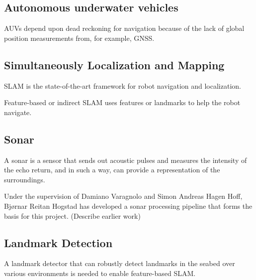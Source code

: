 \subsection{Autonomous underwater vehicles}

AUVs depend upon dead reckoning for navigation because of the lack of global position measurements from, for example, GNSS.

\subsection{Simultaneously Localization and Mapping}

SLAM is the state-of-the-art framework for robot navigation and localization.

Feature-based or indirect SLAM uses features or landmarks to help the robot navigate.

\subsection{Sonar}

A sonar is a sensor that sends out acoustic pulses and measures the intensity of the echo return, and in such a way, can provide a representation of the surroundings.

Under the supervision of  Damiano  Varagnolo and  Simon  Andreas  Hagen  Hoff, Bjørnar Reitan Hogstad has developed a sonar processing pipeline that forms the basis for this project. (Describe earlier work)

\subsection{Landmark Detection}

A landmark detector that can robustly detect landmarks in the seabed over various environments is needed to enable feature-based SLAM.





